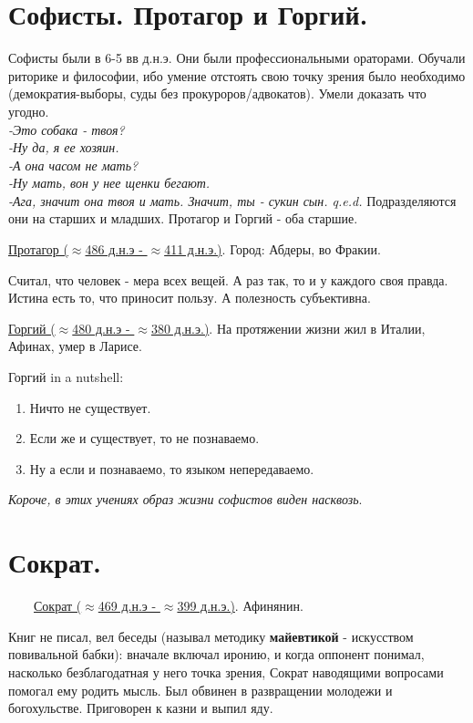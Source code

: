 \documentclass[12pt,a4paper]{article}
\begin{document}
\section{Софисты. Протагор и Горгий.}
Софисты были в 6-5 вв д.н.э. Они были профессиональными ораторами. Обучали риторике и философии, ибо умение отстоять свою точку зрения было необходимо (демократия-выборы, суды без прокуроров/адвокатов). Умели доказать что угодно.
\textit{\\-Это собака - твоя?\\ -Ну да, я ее хозяин.\\-А она часом не мать?\\-Ну мать, вон у нее щенки бегают.\\-Ага, значит она твоя и мать. Значит, ты - сукин сын. q.e.d.}
Подразделяются они на старших и младших. Протагор и Горгий - оба старшие.

\underline{Протагор ($\approx$486 д.н.э - $\approx$411 д.н.э.)}. Город: Абдеры, во Фракии.

Считал, что человек - мера всех вещей. А раз так, то и у каждого своя правда. Истина есть то, что приносит пользу. А полезность субъективна.

\underline{Горгий ($\approx$480 д.н.э - $\approx$380 д.н.э.)}. На протяжении жизни жил в Италии, Афинах, умер в Ларисе. 

Горгий in a nutshell:
\begin{enumerate}
\item Ничто не существует.
\item Если же и существует, то не познаваемо.
\item Ну а если и познаваемо, то языком непередаваемо.
\end{enumerate}

\textit{Короче, в этих учениях образ жизни софистов виден насквозь}.

\section{Сократ.}
\ \ \ \
\underline{Сократ ($\approx$469 д.н.э - $\approx$399 д.н.э.)}. Афинянин.

 Книг не писал, вел беседы (называл методику \textbf{майевтикой} - искусством повивальной бабки): вначале включал иронию, и когда оппонент понимал, насколько безблагодатная у него точка зрения, Сократ наводящими вопросами помогал ему родить мысль. Был обвинен в развращении молодежи и богохульстве. Приговорен к казни и выпил яду.
\end{document}
